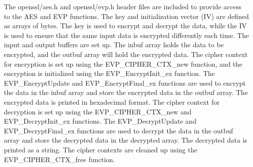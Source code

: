 \documentclass{article}
\begin{document}
The openssl/aes.h and openssl/evp.h header files are included to provide access to the AES and EVP functions. The key and initialization vector (IV) are defined as arrays of bytes. The key is used to encrypt and decrypt the data, while the IV is used to ensure that the same input data is encrypted differently each time. The input and output buffers are set up. The inbuf array holds the data to be encrypted, and the outbuf array will hold the encrypted data. The cipher context for encryption is set up using the EVP\_CIPHER\_CTX\_new function, and the encryption is initialized using the EVP\_EncryptInit\_ex function. The EVP\_EncryptUpdate and EVP\_EncryptFinal\_ex functions are used to encrypt the data in the inbuf array and store the encrypted data in the outbuf array. The encrypted data is printed in hexadecimal format. The cipher context for decryption is set up using the EVP\_CIPHER\_CTX\_new and EVP\_DecryptInit\_ex functions. The EVP\_DecryptUpdate and EVP\_DecryptFinal\_ex functions are used to decrypt the data in the outbuf array and store the decrypted data in the decrypted array. The decrypted data is printed as a string. The cipher contexts are cleaned up using the EVP\_CIPHER\_CTX\_free function.
\end{document}
